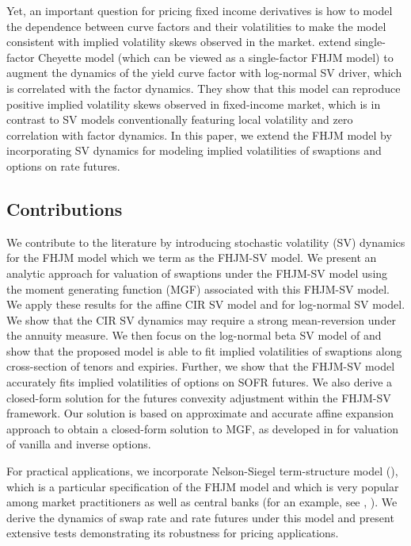 \documentclass[pdftex,11pt,a4paper] {article}
\begin{document}
Yet, an important question for pricing fixed income derivatives is how to model the dependence between curve factors and their volatilities to make the model consistent with implied volatility skews observed in the market. \cite{SeppRakhmonov2023a} extend single-factor Cheyette model (which can be viewed as a single-factor FHJM model) to augment the dynamics of the yield curve factor with log-normal SV driver, which is correlated with the factor dynamics. They show that this model can reproduce positive implied volatility skews observed in fixed-income market, which is in contrast to SV models conventionally featuring local volatility and zero correlation with factor dynamics. In this paper, we extend the FHJM model by incorporating SV dynamics for modeling implied volatilities of swaptions and options on rate futures. 

\subsection{Contributions}

We contribute to the literature by introducing stochastic volatility (SV) dynamics for the FHJM model which we term as the FHJM-SV model. We present an analytic approach for valuation of swaptions under the FHJM-SV model using the moment generating function (MGF) associated with this FHJM-SV model. We apply these results for the affine CIR SV model and for log-normal SV model. We show that the CIR SV dynamics may require a strong mean-reversion under the annuity measure. We then focus on the log-normal beta SV model of \cite{Sepp2012} and show that the proposed model is able to fit implied volatilities of swaptions along cross-section of tenors and expiries. Further, we show that the FHJM-SV model accurately fits implied volatilities of options on SOFR futures. We also derive a closed-form solution for the futures convexity adjustment within the FHJM-SV framework. Our solution is based on approximate and accurate affine expansion approach to obtain a closed-form solution to MGF, as developed in \cite{Sepp2024} for valuation of vanilla and inverse options. 

For practical applications, we incorporate Nelson-Siegel term-structure model (\cite{NS1987}), which is a particular specification of the FHJM model and which is very popular among market practitioners as well as central banks (for an example, see \cite{ChristensenDiebold2009}, \cite{ChristensenDiebold2011}). We derive the dynamics of swap rate and rate futures under this model and present extensive tests demonstrating its robustness for pricing applications. 
\end{document}
